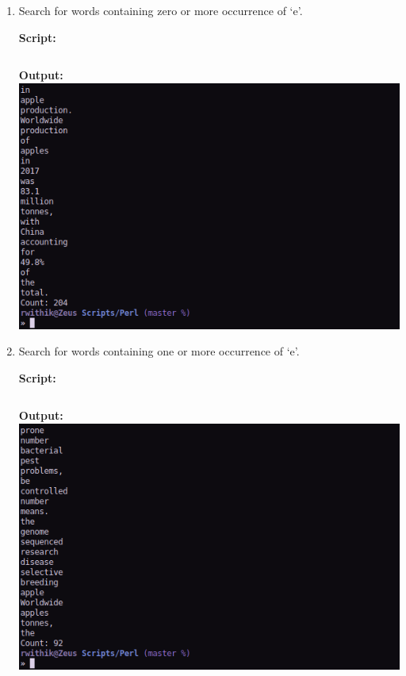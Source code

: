 \documentclass[10pt,a4paper,titlepage]{report}
\begin{document}
\begin{enumerate}
	\item Search for words containing zero or more occurrence of `e’.\newline
	\par
	\textbf{Script: }\newline
	\inputminted[tabsize=4]{perl}{../Scripts/Perl/1e}
	\pagebreak
	\textbf{Output: }\newline\newline
	\includegraphics[width=\linewidth]{../Images/Perl/1e.png}
	\item Search for words containing one or more occurrence of `e’.\newline
	\par
	\textbf{Script: }\newline
	\inputminted[tabsize=4]{perl}{../Scripts/Perl/1f}
	\pagebreak
	\textbf{Output: }\newline\newline
	\includegraphics[width=\linewidth]{../Images/Perl/1f.png}

\end{enumerate}
\end{document}
